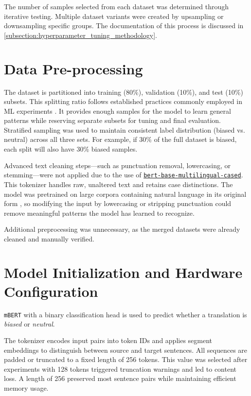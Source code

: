 The number of samples selected from each dataset was determined through iterative testing. Multiple dataset variants were created by upsampling or downsampling specific groups. The documentation of this process is discussed in \autoref{subsection:hyperparameter_tuning_methodology}.

\section{Data Pre-processing}
    The dataset is partitioned into training (80\%), validation (10\%), and test (10\%) subsets. This splitting ratio follows established practices commonly employed in ML experiments \parencite{bahetiTrainTestValidation2021}. It provides enough samples for the model to learn general patterns while reserving separate subsets for tuning and final evaluation. Stratified sampling was used to maintain consistent label distribution (biased vs. neutral) across all three sets. For example, if 30\% of the full dataset is biased, each split will also have 30\% biased samples. 

    Advanced text cleaning steps—such as punctuation removal, lowercasing, or stemming—were not applied due to the use of \href{https://huggingface.co/google-bert/bert-base-multilingual-cased}{\texttt{bert-base-multilingual-cased}}. This tokenizer handles raw, unaltered text and retains case distinctions. The model was pretrained on large corpora containing natural language in its original form \parencite{devlinBERTPretrainingDeep2019}, so modifying the input by lowercasing or stripping punctuation could remove meaningful patterns the model has learned to recognize.

    Additional preprocessing was unnecessary, as the merged datasets were already cleaned and manually verified.

\section{Model Initialization and Hardware Configuration}
    \texttt{mBERT} with a binary classification head is used to predict whether a translation is \textit{biased} or \textit{neutral}.

    The tokenizer encodes input pairs into token IDs and applies segment embeddings to distinguish between source and target sentences. All sequences are padded or truncated to a fixed length of 256 tokens. This value was selected after experiments with 128 tokens triggered truncation warnings and led to content loss. A length of 256 preserved most sentence pairs while maintaining efficient memory usage.

